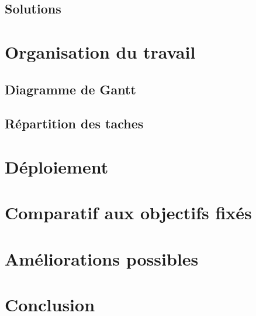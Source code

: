 \documentclass{article}
\begin{document}
	
	\subsection{Solutions}
	
	

\newpage
\section{Organisation du travail}
	\subsection{Diagramme de Gantt}
        
	\subsection{Répartition des taches}
	
\section{Déploiement}


\newpage
\section{Comparatif aux objectifs fixés}
	
\newpage
\section{Améliorations possibles}


\newpage
\section{Conclusion}
	
 
\end{document}
